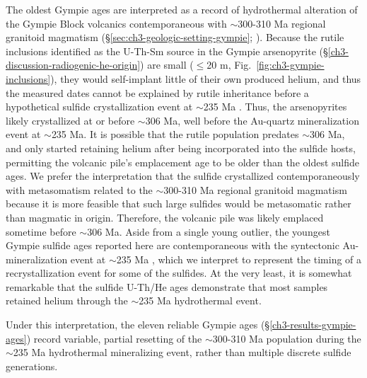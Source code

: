 The oldest Gympie ages are interpreted as a record of hydrothermal alteration of the Gympie Block volcanics contemporaneous with $\sim$300-310 Ma regional granitoid magmatism 
(\S\ref{sec:ch3-geologic-setting-gympie}; \citealp{little1995,holcombe1997}). Because the rutile inclusions identified as the U-Th-Sm source in the
Gympie arsenopyrite (\S\ref{ch3-discussion-radiogenic-he-origin}) are small ($\le$20 \textmu m, Fig.~\ref{fig:ch3-gympie-inclusions}),
they would self-implant little of their own produced helium, and thus the measured dates cannot be explained by rutile inheritance before a hypothetical sulfide crystallization event at $\sim$235 Ma \citep{cuneen1994,holcombe1997}. 
Thus, the arsenopyrites likely crystallized at or before $\sim$306 Ma, well
before the Au-quartz mineralization event at $\sim$235 Ma.
It is possible that the rutile population predates $\sim$306 Ma, and only started retaining helium after being incorporated into the sulfide hosts, permitting the 
volcanic pile's emplacement age to be older than the oldest sulfide ages. We prefer the interpretation that the sulfide crystallized contemporaneously with metasomatism 
related to the $\sim$300-310 Ma regional granitoid magmatism because it is more feasible that such large sulfides would be metasomatic rather than magmatic in origin. Therefore, the volcanic pile was likely emplaced
sometime before $\sim$306 Ma. Aside from a single young outlier, the youngest Gympie sulfide ages reported here are contemporaneous with the syntectonic Au-mineralization event at
$\sim$235 Ma \citep{cuneen1994,holcombe1997}, which we interpret to represent the timing of a recrystallization event for some of the sulfides. 
At the very least, it is somewhat remarkable that the sulfide U-Th/He ages demonstrate that most samples retained helium through the $\sim$235 Ma hydrothermal event.

Under this interpretation, the eleven reliable Gympie ages
(\S\ref{ch3-results-gympie-ages}) record variable, partial resetting of
the $\sim$300-310 Ma population during the $\sim$235 Ma
hydrothermal mineralizing event, rather than multiple discrete sulfide
generations.

